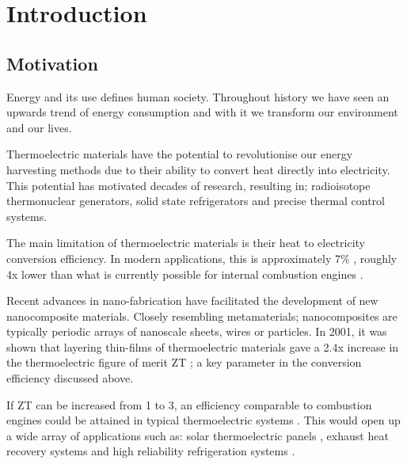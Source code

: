 \documentclass[12pt]{article}
\newcommand{\tms}{\textsf{x} }
\begin{document}
\pagebreak

\tableofcontents

\pagebreak


\pagestyle{fancy}

\section{Introduction}
 
\subsection{Motivation}
\label{sec:motivation}
Energy and its use defines human society. Throughout history we have seen an upwards trend of energy consumption and with it we transform our environment and our lives.

Thermoelectric materials have the potential to revolutionise our energy harvesting methods due to their ability to convert heat directly into electricity. This potential has motivated decades of research, resulting in; radioisotope thermonuclear generators, solid state refrigerators and precise thermal control systems.

The main limitation of thermoelectric materials is their heat to electricity conversion efficiency. In modern applications, this is approximately 7\% \cite{modern-thermoelectrics}, roughly 4\tms lower than what is currently possible for internal combustion engines \cite{engine-efficiency}.

Recent advances in nano-fabrication have facilitated the development of new nanocomposite materials. Closely resembling metamaterials; nanocomposites are typically periodic arrays of nanoscale sheets, wires or particles. In 2001, it was shown that layering thin-films of thermoelectric materials gave a 2.4\tms increase in the thermoelectric figure of merit ZT \cite{nanocomposite-zt}; a key parameter in the conversion efficiency discussed above.

If ZT can be increased from 1 to 3, an efficiency comparable to combustion engines could be attained in typical thermoelectric systems \cite{liu-review}. This would open up a wide array of applications such as: solar thermoelectric panels \cite{solar-thermal}, exhaust heat recovery systems \cite{exhust-recovery} and high reliability refrigeration systems \cite{thermo-cooling}.
\end{document}
